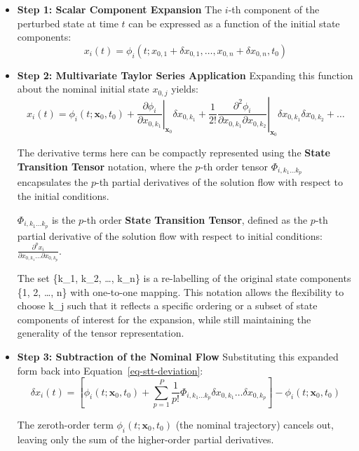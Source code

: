 \documentclass[
  letterpaper,
  DIV=11,
  numbers=noendperiod,
  oneside]{scrartcl}
\begin{document}
\begin{itemize}
\item
  \textbf{Step 1: Scalar Component Expansion} The \(i\)-th component of
  the perturbed state at time \(t\) can be expressed as a function of
  the initial state components: \[
  x_i(t) = \phi_i(t; x_{0,1} + \delta x_{0,1}, \dots, x_{0,n} + \delta x_{0,n}, t_0)
  \]
\item
  \textbf{Step 2: Multivariate Taylor Series Application} Expanding this
  function about the nominal initial state \(x_{0,j}\) yields: \[
  x_i(t) = \phi_i(t; \mathbf{x}_0, t_0) + \left. \frac{\partial \phi_i}{\partial x_{0,k_1}} \right|_{\mathbf{x}_0} \delta x_{0,k_1} + \frac{1}{2!} \left. \frac{\partial^2 \phi_i}{\partial x_{0,k_1} \partial x_{0,k_2}} \right|_{\mathbf{x}_0} \delta x_{0,k_1} \delta x_{0,k_2} + \dots
  \]

  The derivative terms here can be compactly represented using the
  \textbf{State Transition Tensor} notation, where the \(p\)-th order
  tensor \(\Phi_{i,k_1 \dots k_p}\) encapsulates the \(p\)-th partial
  derivatives of the solution flow with respect to the initial
  conditions.

  \begin{tcolorbox}[enhanced jigsaw, arc=.35mm, bottomrule=.15mm, bottomtitle=1mm, breakable, colback=white, colbacktitle=quarto-callout-note-color!10!white, colframe=quarto-callout-note-color-frame, coltitle=black, left=2mm, leftrule=.75mm, opacityback=0, opacitybacktitle=0.6, rightrule=.15mm, title=\textcolor{quarto-callout-note-color}{\faInfo}\hspace{0.5em}{State Transition Tensor Definition}, titlerule=0mm, toprule=.15mm, toptitle=1mm]

  \(\Phi_{i,k_1 \dots k_p}\) is the \(p\)-th order \textbf{State
  Transition Tensor}, defined as the \(p\)-th partial derivative of the
  solution flow with respect to initial conditions:
  \(\frac{\partial^p x_i}{\partial x_{0,k_1} \dots \partial x_{0,k_p}}\).

  The set \{k\_1, k\_2, \ldots, k\_n\} is a re-labelling of the original
  state components \{1, 2, \ldots, n\} with one-to-one mapping. This
  notation allows the flexibility to choose k\_j such that it reflects a
  specific ordering or a subset of state components of interest for the
  expansion, while still maintaining the generality of the tensor
  representation.

  \end{tcolorbox}
\item
  \textbf{Step 3: Subtraction of the Nominal Flow} Substituting this
  expanded form back into Equation~\ref{eq-stt-deviation}: \[
  \delta x_i(t) = \left[ \phi_i(t; \mathbf{x}_0, t_0) + \sum_{p=1}^P \frac{1}{p!} \Phi_{i,k_1 \dots k_p} \delta x_{0,k_1} \dots \delta x_{0,k_p} \right] - \phi_i(t; \mathbf{x}_0, t_0)
  \]

  The zeroth-order term \(\phi_i(t; \mathbf{x}_0, t_0)\) (the nominal
  trajectory) cancels out, leaving only the sum of the higher-order
  partial derivatives.
\end{itemize}
\end{document}
